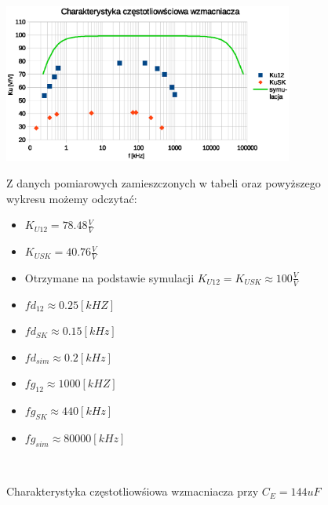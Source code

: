 \documentclass[a4paper,12pt]{article}
\begin{document}
\begin{figure}[h!]
  \begin{center}
  \includegraphics[width=0.85\textwidth]{g1.eps}
  \caption{Charakterystyka częstotliowśiowa wzmacniacza przy $C_E = 144uF$}
  \end{center}

  Z danych pomiarowych zamieszczonych w tabeli oraz powyższego wykresu możemy odczytać:
  \begin{itemize}
  \item $K_{U12} = 78.48 \frac{V}{V}$
  \item $K_{USK} = 40.76 \frac{V}{V}$
  \item Otrzymane na podstawie symulacji $K_{U12}=K_{USK}\approx 100\frac{V}{V}$
  \item $fd_{12} \approx 0.25[kHZ]$
  \item $fd_{SK} \approx 0.15[kHz]$
  \item $fd_{sim} \approx 0.2[kHz]$
  \item $fg_{12} \approx 1000[kHZ]$
  \item $fg_{SK} \approx 440[kHz]$
  \item $fg_{sim} \approx 80000[kHz]$


  \end{itemize}
    $ $ \newline
$ $ \newline
$ $ \newline
\end{figure}
\end{document}
